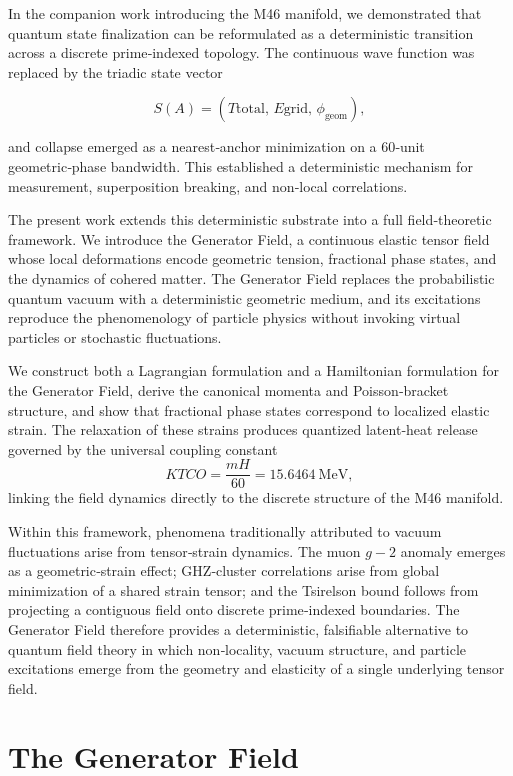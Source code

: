 \documentclass[reprint,amsmath,amssymb,aps,prl,floatfix]{revtex4-2}
\begin{document}
In the companion work introducing the M46 manifold, we demonstrated that quantum state finalization can be reformulated as a deterministic transition across a discrete prime‑indexed topology. The continuous wave function was replaced by the triadic state vector  
\medskip

\[
S(A) = (T{\mathrm{total}},\,E{\mathrm{grid}},\,\phi_{\mathrm{geom}}),
\]  
\medskip

and collapse emerged as a nearest‑anchor minimization on a 60‑unit geometric‑phase bandwidth. This established a deterministic mechanism for measurement, superposition breaking, and non‑local correlations.
\medskip

The present work extends this deterministic substrate into a full field‑theoretic framework. We introduce the Generator Field, a continuous elastic tensor field whose local deformations encode geometric tension, fractional phase states, and the dynamics of cohered matter. The Generator Field replaces the probabilistic quantum vacuum with a deterministic geometric medium, and its excitations reproduce the phenomenology of particle physics without invoking virtual particles or stochastic fluctuations.
\medskip

We construct both a Lagrangian formulation and a Hamiltonian formulation for the Generator Field, derive the canonical momenta and Poisson‑bracket structure, and show that fractional phase states correspond to localized elastic strain. The relaxation of these strains produces quantized latent‑heat release governed by the universal coupling constant  
\[
K{TCO} = \frac{mH}{60} = 15.6464\ \mathrm{MeV},
\]  
linking the field dynamics directly to the discrete structure of the M46 manifold.
\medskip

Within this framework, phenomena traditionally attributed to vacuum fluctuations arise from tensor‑strain dynamics. The muon \(g-2\) anomaly emerges as a geometric‑strain effect; GHZ‑cluster correlations arise from global minimization of a shared strain tensor; and the Tsirelson bound follows from projecting a contiguous field onto discrete prime‑indexed boundaries. The Generator Field therefore provides a deterministic, falsifiable alternative to quantum field theory in which non‑locality, vacuum structure, and particle excitations emerge from the geometry and elasticity of a single underlying tensor field.

\section{The Generator Field}
\end{document}
